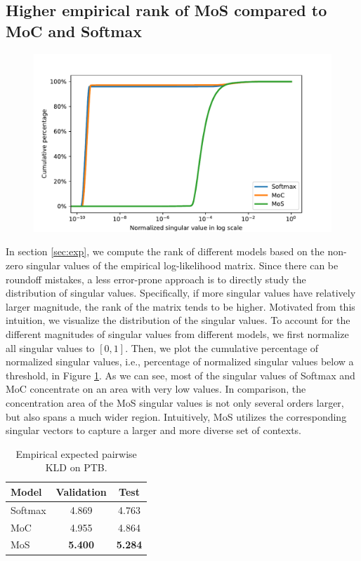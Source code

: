 \subsection{Higher empirical rank of  MoS compared to MoC and Softmax}
\label{sec:a-rank}
\begin{figure}[!h]
	\centering
	\includegraphics[width=0.8\linewidth]{FIG/singular-all.pdf}
	\label{fig:quantitative}
\end{figure}
In section \ref{sec:exp}, we compute the rank of different models based on the non-zero singular values of the empirical log-likelihood matrix.
Since there can be roundoff mistakes, a less error-prone approach is to directly study the distribution of singular values.
Specifically, if more singular values have relatively larger magnitude, the rank of the matrix tends to be higher.
Motivated from this intuition, we visualize the distribution of the singular values. To account for the different magnitudes of singular values from different models, we first normalize all singular values to $[0, 1]$. Then, we plot the cumulative percentage of normalized singular values, i.e., percentage of normalized singular values below a threshold, in Figure \ref{fig:quantitative}. As we can see, most of the singular values of Softmax and MoC concentrate on an area with very low values. In comparison, the concentration area of the MoS singular values is not only several orders larger, but also spans a much wider region. 
Intuitively, MoS utilizes the corresponding singular vectors to capture a larger and more diverse set of contexts. 

\begin{table}[!h]
	\centering
	\small
	\begin{tabular}{l|cc}
		\toprule
		\bf Model & \bf Validation & \bf Test \\
		\midrule
		Softmax & 4.869 & 4.763  \\
		MoC & 4.955 & 4.864 \\
		MoS & \bf 5.400 & \bf 5.284 \\
		\bottomrule
	\end{tabular}
	\caption{Empirical expected pairwise KLD on PTB.}
	\label{table:kld}
\end{table}

